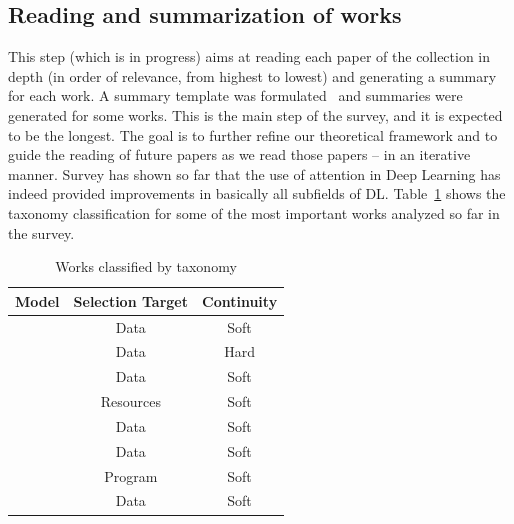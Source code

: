 \documentclass[12pt]{article}
\begin{document}
\subsection{Reading and summarization of works}
This step (which is in progress) aims at reading each paper of the collection in depth
(in order of relevance, from highest to lowest) and generating a summary for each work.
A summary template was formulated~\cite{ref:paper-anal-template} and summaries were generated for some works.
This is the main step of the survey, and it is expected to be the longest.
The goal is to further refine our theoretical framework and to guide the reading of future papers as we read those papers
-- in an iterative manner.
Survey has shown so far that the use of attention in Deep Learning has indeed provided improvements in basically all
subfields of DL.
Table~\ref{table:taxonomy} shows the taxonomy classification for some of the most important works analyzed so far in the survey.

\begin{table}[H]
\centering
\caption{\small Works classified by taxonomy}
\begin{tabular}{|c|c|c|}
	\hline
    \textbf{Model} & \textbf{Selection Target} & \textbf{Continuity}\\
    \hline
    \cite{ref:show-attend-tell} & Data & Soft\\
    \hline
    \cite{ref:rec-models} & Data & Hard\\
    \hline
    \cite{ref:one-shot} & Data & Soft\\
    \hline
    \cite{ref:act} & Resources & Soft\\
    \hline
    \cite{ref:ntm} & Data & Soft\\
    \hline
    \cite{ref:img-captioning} & Data & Soft\\
    \hline
    \cite{ref:np} & Program & Soft\\
    \hline
    \cite{ref:transformer} & Data & Soft\\
    \hline
\end{tabular}
\label{table:taxonomy}
\end{table}

\newpage
\printbibliography

%
%
\end{document}
